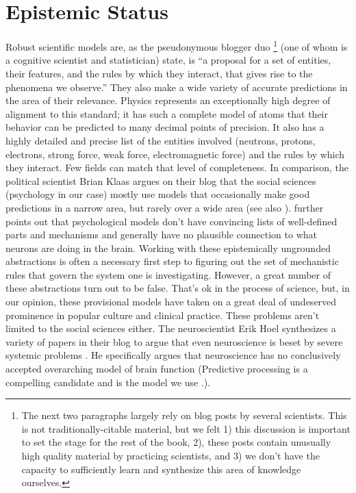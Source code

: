 \documentclass[12pt,letterpaper]{book}
\begin{document}
\section{Epistemic Status}
\label{sec:assumptions}
Robust scientific models are, as the pseudonymous blogger duo \footnote{The next two paragraphs largely rely on blog posts by several scientists. This is not traditionally-citable material, but we felt 1) this discussion is important to set the stage for the rest of the book, 2), these posts contain unusually high quality material by practicing scientists, and 3) we don't have the capacity to sufficiently learn and synthesize this area of knowledge ourselves.} \textcite{mechanisticModels} (one of whom is a cognitive scientist and statistician) state, is “a proposal for a set of entities, their features, and the rules by which they interact, that gives rise to the phenomena we observe.” They also make a wide variety of accurate predictions in the area of their relevance. Physics represents an exceptionally high degree of alignment to this standard; it has such a complete model of atoms that their behavior can be predicted to many decimal points of precision. It also has a highly detailed and precise list of the entities involved (neutrons, protons, electrons, strong force, weak force, electromagnetic force) and the rules by which they interact. Few fields can match that level of completeness. In comparison, the political scientist Brian Klaas argues on their blog that the social sciences (psychology in our case) mostly use models that occasionally make good predictions in a narrow area, but rarely over a wide area \cite{zombieSocialScience} (see also \textcite{evidenceBasedPolicy}). \textcite{mechanisticModels} further points out that psychological models don't have convincing lists of well-defined parts and mechanisms and generally have no plausible connection to what neurons are doing in the brain. Working with these epistemically ungrounded abstractions is often a necessary first step to figuring out the set of mechanistic rules that govern the system one is investigating. However, a great number of these abstractions turn out to be false. That’s ok in the process of science, but, in our opinion, these provisional models have taken on a great deal of undeserved prominence in popular culture and clinical practice. These problems aren't limited to the social sciences either. The neuroscientist Erik Hoel synthesizes a variety of papers in their blog to argue that even neuroscience is beset by severe systemic problems \cite{hoelNeuroscience}. He specifically argues that neuroscience has no conclusively accepted overarching model of brain function (Predictive processing is a compelling candidate and is the model we use \cite{clark2015surfing}.).
\end{document}
